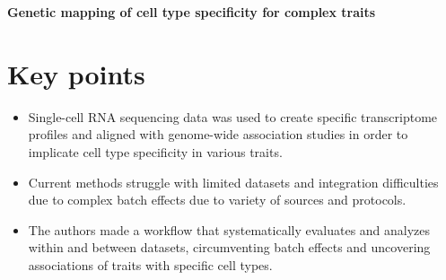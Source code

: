 \documentclass[plain,basic]{inVerba-notes}
\begin{document}
    

\begin{center}
    \textbf{\LARGE{Genetic mapping of cell type specificity for complex traits}}
\end{center}

\section{Key points}
\begin{itemize}
    \item Single-cell RNA sequencing data was used to create specific transcriptome profiles and aligned with genome-wide association studies in order to implicate cell type specificity in various traits.
    \item Current methods struggle with limited datasets and integration difficulties due to complex batch effects due to variety of sources and protocols.
    \item The authors made a workflow that systematically evaluates and analyzes within and between datasets, circumventing batch effects and uncovering associations of traits with specific cell types.
\end{itemize}
\end{document}
